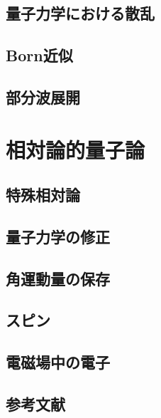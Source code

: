 \documentclass{report}
\begin{document}
    \section{量子力学における散乱}
      
    \section{Born近似}
      
    \section{部分波展開}
      
  \chapter{相対論的量子論}
    \section{特殊相対論}
      
    \section{量子力学の修正}
      
    \section{角運動量の保存}
      
    \section{スピン}
      
    \section{電磁場中の電子}
      
    \section*{参考文献}
      
\end{document}
